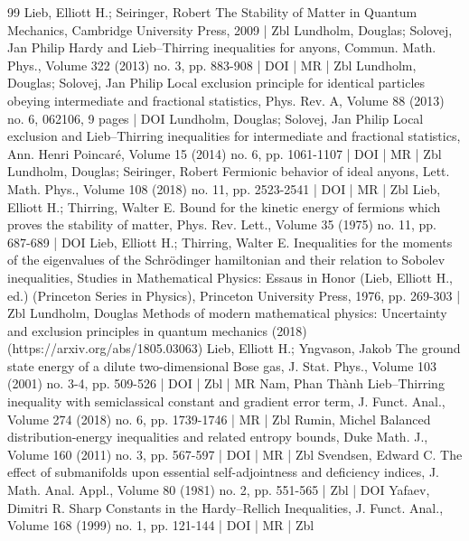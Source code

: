 \documentclass[10pt]{amsart}
\theoremstyle{definition}\newtheorem{defi}[theo]{Definition}\newtheorem{rema}[theo]{Remark}\newtheorem{exam}[theo]{Example}\newtheorem{exem}[theo]{Example}\newtheorem{nota}[theo]{Notation}
\newcommand\1{{\ensuremath {\mathds 1} }}
\begin{document}
\begin{thebibliography}{99}
Lieb, Elliott H.; Seiringer, Robert The Stability of Matter in Quantum Mechanics, Cambridge University Press, 2009 | Zbl
Lundholm, Douglas; Solovej, Jan Philip Hardy and Lieb–Thirring inequalities for anyons, Commun. Math. Phys., Volume 322 (2013) no. 3, pp. 883-908 | DOI | MR | Zbl
Lundholm, Douglas; Solovej, Jan Philip Local exclusion principle for identical particles obeying intermediate and fractional statistics, Phys. Rev. A, Volume 88 (2013) no. 6, 062106, 9 pages | DOI
Lundholm, Douglas; Solovej, Jan Philip Local exclusion and Lieb–Thirring inequalities for intermediate and fractional statistics, Ann. Henri Poincaré, Volume 15 (2014) no. 6, pp. 1061-1107 | DOI | MR | Zbl
Lundholm, Douglas; Seiringer, Robert Fermionic behavior of ideal anyons, Lett. Math. Phys., Volume 108 (2018) no. 11, pp. 2523-2541 | DOI | MR | Zbl
Lieb, Elliott H.; Thirring, Walter E. Bound for the kinetic energy of fermions which proves the stability of matter, Phys. Rev. Lett., Volume 35 (1975) no. 11, pp. 687-689 | DOI
Lieb, Elliott H.; Thirring, Walter E. Inequalities for the moments of the eigenvalues of the Schrödinger hamiltonian and their relation to Sobolev inequalities, Studies in Mathematical Physics: Essaus in Honor (Lieb, Elliott H., ed.) (Princeton Series in Physics), Princeton University Press, 1976, pp. 269-303 | Zbl
Lundholm, Douglas Methods of modern mathematical physics: Uncertainty and exclusion principles in quantum mechanics (2018) (https://arxiv.org/abs/1805.03063)
Lieb, Elliott H.; Yngvason, Jakob The ground state energy of a dilute two-dimensional Bose gas, J. Stat. Phys., Volume 103 (2001) no. 3-4, pp. 509-526 | DOI | Zbl | MR
Nam, Phan Thành Lieb–Thirring inequality with semiclassical constant and gradient error term, J. Funct. Anal., Volume 274 (2018) no. 6, pp. 1739-1746 | MR | Zbl
Rumin, Michel Balanced distribution-energy inequalities and related entropy bounds, Duke Math. J., Volume 160 (2011) no. 3, pp. 567-597 | DOI | MR | Zbl
Svendsen, Edward C. The effect of submanifolds upon essential self-adjointness and deficiency indices, J. Math. Anal. Appl., Volume 80 (1981) no. 2, pp. 551-565 | Zbl | DOI
Yafaev, Dimitri R. Sharp Constants in the Hardy–Rellich Inequalities, J. Funct. Anal., Volume 168 (1999) no. 1, pp. 121-144 | DOI | MR | Zbl
\end{thebibliography}
\end{document}
